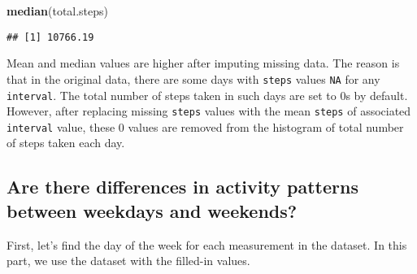 \documentclass[
]{article}
\newenvironment{Shaded}{\begin{snugshade}}{\end{snugshade}}
\newcommand{\AttributeTok}[1]{\textcolor[rgb]{0.13,0.29,0.53}{#1}}
\newcommand{\ControlFlowTok}[1]{\textcolor[rgb]{0.13,0.29,0.53}{\textbf{#1}}}
\newcommand{\FunctionTok}[1]{\textcolor[rgb]{0.13,0.29,0.53}{\textbf{#1}}}
\newcommand{\NormalTok}[1]{#1}
\newcommand{\OtherTok}[1]{\textcolor[rgb]{0.56,0.35,0.01}{#1}}
\newcommand{\SpecialCharTok}[1]{\textcolor[rgb]{0.81,0.36,0.00}{\textbf{#1}}}
\newcommand{\StringTok}[1]{\textcolor[rgb]{0.31,0.60,0.02}{#1}}
\begin{document}
\begin{Shaded}
\begin{Highlighting}[]
\FunctionTok{median}\NormalTok{(total.steps)}
\end{Highlighting}
\end{Shaded}

\begin{verbatim}
## [1] 10766.19
\end{verbatim}

Mean and median values are higher after imputing missing data. The
reason is that in the original data, there are some days with
\texttt{steps} values \texttt{NA} for any \texttt{interval}. The total
number of steps taken in such days are set to 0s by default. However,
after replacing missing \texttt{steps} values with the mean
\texttt{steps} of associated \texttt{interval} value, these 0 values are
removed from the histogram of total number of steps taken each day.

\subsection{Are there differences in activity patterns between weekdays
and
weekends?}\label{are-there-differences-in-activity-patterns-between-weekdays-and-weekends}

First, let's find the day of the week for each measurement in the
dataset. In this part, we use the dataset with the filled-in values.

\begin{Shaded}
\end{Shaded}
\end{document}
